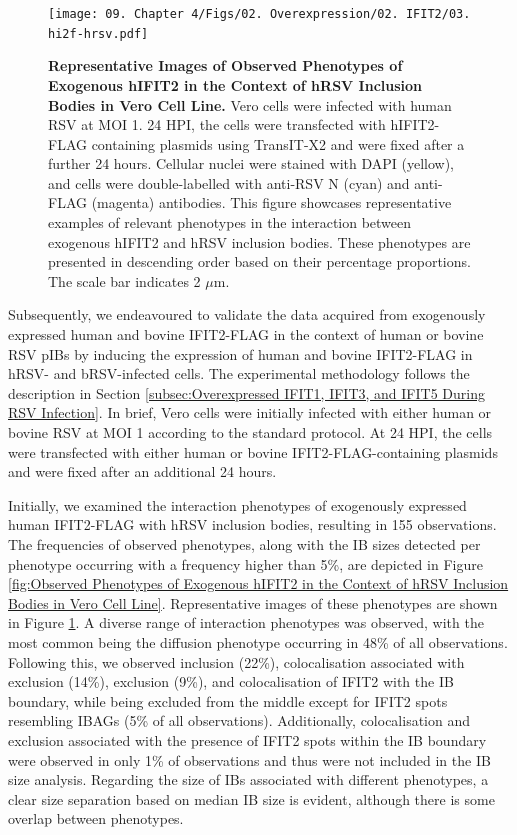 \begin{figure}
    \centering
    \texttt{[image: 09. Chapter 4/Figs/02. Overexpression/02. IFIT2/03. hi2f-hrsv.pdf]}
    \caption[Representative Images of Observed Phenotypes of Exogenous hIFIT2 in the Context of hRSV Inclusion Bodies in Vero Cell Line.]{\textbf{Representative Images of Observed Phenotypes of Exogenous hIFIT2 in the Context of hRSV Inclusion Bodies in Vero Cell Line.} Vero cells were infected with human RSV at MOI 1. 24 HPI, the cells were transfected with hIFIT2-FLAG containing plasmids using TransIT-X2 and were fixed after a further 24 hours. Cellular nuclei were stained with DAPI (yellow), and cells were double-labelled with anti-RSV N (cyan) and anti-FLAG (magenta) antibodies. This figure showcases representative examples of relevant phenotypes in the interaction between exogenous hIFIT2 and hRSV inclusion bodies. These phenotypes are presented in descending order based on their percentage proportions. The scale bar indicates 2 \(\mu \mbox{m}\).}
    \label{fig:Representative Images of Observed Phenotypes of Exogenous hIFIT2 in the Context of hRSV Inclusion Bodies in Vero Cell Line}
\end{figure}

Subsequently, we endeavoured to validate the data acquired from exogenously expressed human and bovine IFIT2-FLAG in the context of human or bovine RSV pIBs by inducing the expression of human and bovine IFIT2-FLAG in hRSV- and bRSV-infected cells. The experimental methodology follows the description in Section \ref{subsec:Overexpressed IFIT1, IFIT3, and IFIT5 During RSV Infection}. In brief, Vero cells were initially infected with either human or bovine RSV at MOI 1 according to the standard protocol. At 24 HPI, the cells were transfected with either human or bovine IFIT2-FLAG-containing plasmids and were fixed after an additional 24 hours.

Initially, we examined the interaction phenotypes of exogenously expressed human IFIT2-FLAG with hRSV inclusion bodies, resulting in 155 observations. The frequencies of observed phenotypes, along with the IB sizes detected per phenotype occurring with a frequency higher than 5\%, are depicted in Figure \ref{fig:Observed Phenotypes of Exogenous hIFIT2 in the Context of hRSV Inclusion Bodies in Vero Cell Line}. Representative images of these phenotypes are shown in Figure \ref{fig:Representative Images of Observed Phenotypes of Exogenous hIFIT2 in the Context of hRSV Inclusion Bodies in Vero Cell Line}. A diverse range of interaction phenotypes was observed, with the most common being the diffusion phenotype occurring in 48\% of all observations. Following this, we observed inclusion (22\%), colocalisation associated with exclusion (14\%), exclusion (9\%), and colocalisation of IFIT2 with the IB boundary, while being excluded from the middle except for IFIT2 spots resembling IBAGs (5\% of all observations). Additionally, colocalisation and exclusion associated with the presence of IFIT2 spots within the IB boundary were observed in only 1\% of observations and thus were not included in the IB size analysis. Regarding the size of IBs associated with different phenotypes, a clear size separation based on median IB size is evident, although there is some overlap between phenotypes.

